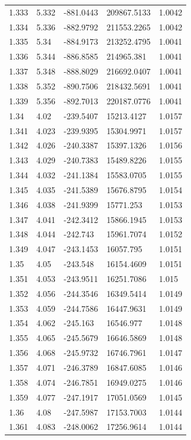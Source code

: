 \begin{tabular}{lllll}
1.333 & 5.332 & -881.0443 & 209867.5133 & 1.0042 \\
1.334 & 5.336 & -882.9792 & 211553.2265 & 1.0042 \\
1.335 & 5.34 & -884.9173 & 213252.4795 & 1.0041 \\
1.336 & 5.344 & -886.8585 & 214965.381 & 1.0041 \\
1.337 & 5.348 & -888.8029 & 216692.0407 & 1.0041 \\
1.338 & 5.352 & -890.7506 & 218432.5691 & 1.0041 \\
1.339 & 5.356 & -892.7013 & 220187.0776 & 1.0041 \\
1.34 & 4.02 & -239.5407 & 15213.4127 & 1.0157 \\
1.341 & 4.023 & -239.9395 & 15304.9971 & 1.0157 \\
1.342 & 4.026 & -240.3387 & 15397.1326 & 1.0156 \\
1.343 & 4.029 & -240.7383 & 15489.8226 & 1.0155 \\
1.344 & 4.032 & -241.1384 & 15583.0705 & 1.0155 \\
1.345 & 4.035 & -241.5389 & 15676.8795 & 1.0154 \\
1.346 & 4.038 & -241.9399 & 15771.253 & 1.0153 \\
1.347 & 4.041 & -242.3412 & 15866.1945 & 1.0153 \\
1.348 & 4.044 & -242.743 & 15961.7074 & 1.0152 \\
1.349 & 4.047 & -243.1453 & 16057.795 & 1.0151 \\
1.35 & 4.05 & -243.548 & 16154.4609 & 1.0151 \\
1.351 & 4.053 & -243.9511 & 16251.7086 & 1.015 \\
1.352 & 4.056 & -244.3546 & 16349.5414 & 1.0149 \\
1.353 & 4.059 & -244.7586 & 16447.9631 & 1.0149 \\
1.354 & 4.062 & -245.163 & 16546.977 & 1.0148 \\
1.355 & 4.065 & -245.5679 & 16646.5869 & 1.0148 \\
1.356 & 4.068 & -245.9732 & 16746.7961 & 1.0147 \\
1.357 & 4.071 & -246.3789 & 16847.6085 & 1.0146 \\
1.358 & 4.074 & -246.7851 & 16949.0275 & 1.0146 \\
1.359 & 4.077 & -247.1917 & 17051.0569 & 1.0145 \\
1.36 & 4.08 & -247.5987 & 17153.7003 & 1.0144 \\
1.361 & 4.083 & -248.0062 & 17256.9614 & 1.0144 \\

\end{tabular}
